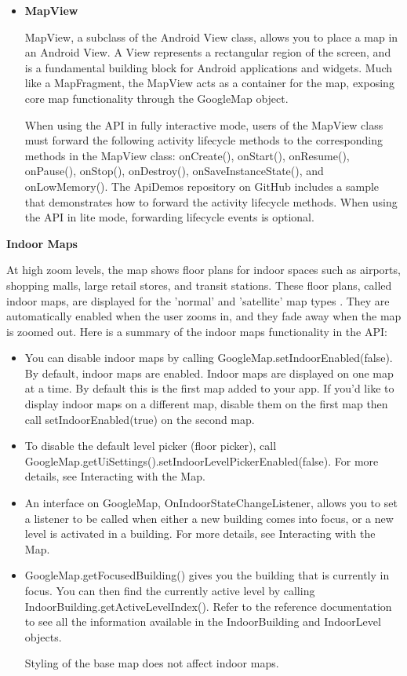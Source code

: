 \begin{itemize}
\item\textbf{MapView}

MapView, a subclass of the Android View class, allows you to place a map in an Android View. A View represents a rectangular region of the screen, and is a fundamental building block for Android applications and widgets. Much like a MapFragment, the MapView acts as a container for the map, exposing core map functionality through the GoogleMap object.

When using the API in fully interactive mode, users of the MapView class must forward the following activity lifecycle methods to the corresponding methods in the MapView class: onCreate(), onStart(), onResume(), onPause(), onStop(), onDestroy(), onSaveInstanceState(), and onLowMemory(). The ApiDemos repository on GitHub includes a sample that demonstrates how to forward the activity lifecycle methods. When using the API in lite mode, forwarding lifecycle events is optional.\cite{am004}
\end{itemize}

\textbf{Indoor Maps}

At high zoom levels, the map shows floor plans for indoor spaces such as airports, shopping malls, large retail stores, and transit stations. These floor plans, called indoor maps, are displayed for the 'normal' and 'satellite' map types . They are automatically enabled when the user zooms in, and they fade away when the map is zoomed out.
  Here is a summary of the indoor maps functionality in the API:
\begin{itemize}
    \item You can disable indoor maps by calling GoogleMap.setIndoorEnabled(false). By default, indoor maps are enabled. Indoor maps are displayed on one map at a time. By default this is the first map added to your app. If you'd like to display indoor maps on a different map, disable them on the first map then call setIndoorEnabled(true) on the second map.
\item To disable the default level picker (floor picker), call GoogleMap.getUiSettings().setIndoorLevelPickerEnabled(false). For more details, see Interacting with the Map.

\item An interface on GoogleMap, OnIndoorStateChangeListener, allows you to set a listener to be called when either a new building comes into focus, or a new level is activated in a building. For more details, see Interacting with the Map.
\item GoogleMap.getFocusedBuilding() gives you the building that is currently in focus. You can then find the currently active level by calling IndoorBuilding.getActiveLevelIndex(). Refer to the reference documentation to see all the information available in the IndoorBuilding and IndoorLevel objects.

Styling of the base map does not affect indoor maps.
\end{itemize}


